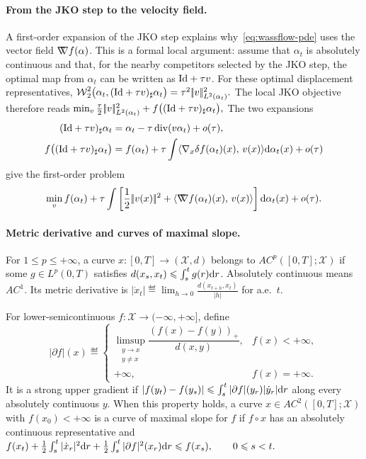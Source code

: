 \paragraph{From the JKO step to the velocity field.}
A first-order expansion of the JKO step explains why~\eqref{eq:wassflow-pde} uses the vector field $\mathord{\nabla\mkern-9.3mu\nabla} f(\alpha)$. This is a formal local argument: assume that $\alpha_t$ is absolutely continuous and that, for the nearby competitors selected by the JKO step, the optimal map from $\alpha_t$ can be written as $\mathrm{Id}+\tau v$. For these optimal displacement representatives,
\(\operatorname{\mathcal{W}}_2^2\bigl(\alpha_t,(\mathrm{Id}+\tau v)_\sharp\alpha_t\bigr) = \tau^2|\!| v |\!|_{L^2(\alpha_t)}^2.\)
The local JKO objective therefore reads \(\min_v \frac{\tau}{2}|\!| v |\!|_{L^2(\alpha_t)}^2 +f\bigl((\mathrm{Id}+\tau v)_\sharp\alpha_t\bigr),\)
The two expansions
\begin{align*}
(\mathrm{Id}+\tau v)_\sharp\alpha_t
&=
\alpha_t-\tau\operatorname{div}(v\alpha_t)+o(\tau),\\
f\bigl((\mathrm{Id}+\tau v)_\sharp\alpha_t\bigr)
&=
f(\alpha_t)
+\tau\int\langle \nabla_x\delta f(\alpha_t)(x),\,v(x)\rangle\mathrm{d}\alpha_t(x)
+o(\tau)
\end{align*}
give the first-order problem
\[
\min_v f(\alpha_t)
+\tau\int\left[
\frac12|\!| v(x) |\!|^2
+\langle \mathord{\nabla\mkern-9.3mu\nabla} f(\alpha_t)(x),\,v(x)\rangle
\right]\mathrm{d}\alpha_t(x)
+o(\tau).
\]
\paragraph{Metric derivative and curves of maximal slope.}
\begin{defn}\label{def-metric-derivative-ac-curve}
For \(1\leq p\leq+\infty\), a curve $x:[0,T]\to(\mathcal X,d)$ belongs to \(AC^p([0,T];\mathcal X)\) if some $g\in L^p(0,T)$ satisfies $d(x_s,x_t)\leqslant\int_s^t g(r)\mathrm{d} r$. Absolutely continuous means \(AC^1\). Its metric derivative is
\(|\dot x_t| \eqdef \lim_{h\to 0}\frac{d(x_{t+h},x_t)}{|h|}\)
for a.e.\ $t$.
\end{defn}
\begin{defn}\label{def-curve-maximal-slope}
For lower-semicontinuous $f:\mathcal X\to(-\infty,+\infty]$, define
\[
|\partial f|(x)
\eqdef
\begin{cases}
\limsup_{\substack{y\to x\\ y\neq x}}
\dfrac{( f(x)-f(y) )_+}{d(x,y)}, & f(x)<+\infty,\\[.4em]
+\infty, & f(x)=+\infty.
\end{cases}
\]
It is a strong upper gradient if $|f(y_t)-f(y_s)|\leqslant \int_s^t |\partial f|(y_r)|\dot y_r|\mathrm{d} r$ along every absolutely continuous $y$. When this property holds, a curve $x\in AC^2([0,T];\mathcal X)$ with $f(x_0)<+\infty$ is a curve of maximal slope for $f$ if $f\circ x$ has an absolutely continuous representative and
\(f(x_t) +\frac12\int_s^t |\dot x_r|^2\mathrm{d} r +\frac12\int_s^t |\partial f|^2(x_r)\mathrm{d} r \leqslant f(x_s), \qquad 0\leqslant s<t.\)
\end{defn}

